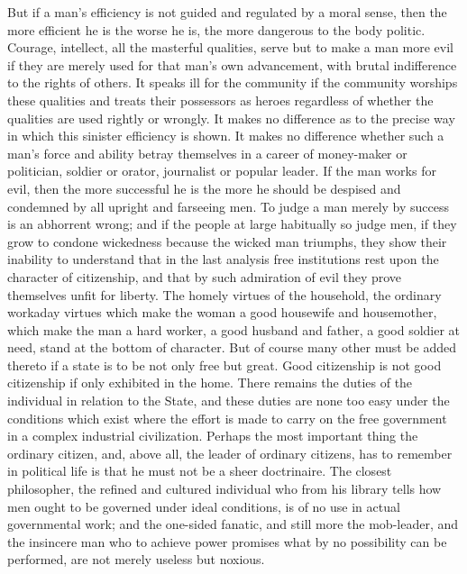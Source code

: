 \documentclass{scrbook}
\begin{document}
But if a man’s efficiency is not guided and regulated by a moral sense, then the more
efficient he is the worse he is, the more dangerous to the body politic. Courage, intellect, all
the masterful qualities, serve but to make a man more evil if they are merely used for that
man’s own advancement, with brutal indifference to the rights of others. It speaks ill for the
community if the community worships these qualities and treats their possessors as heroes
regardless of whether the qualities are used rightly or wrongly. It makes no difference as to
the precise way in which this sinister efficiency is shown. It makes no difference whether
such a man’s force and ability betray themselves in a career of money-maker or politician,
soldier or orator, journalist or popular leader. If the man works for evil, then the more
successful he is the more he should be despised and condemned by all upright and farseeing men. To judge a man merely by success is an abhorrent wrong; and if the people at
large habitually so judge men, if they grow to condone wickedness because the wicked man
triumphs, they show their inability to understand that in the last analysis free institutions rest
upon the character of citizenship, and that by such admiration of evil they prove themselves
unfit for liberty. The homely virtues of the household, the ordinary workaday virtues which
make the woman a good housewife and housemother, which make the man a hard worker,
a good husband and father, a good soldier at need, stand at the bottom of character. But
of course many other must be added thereto if a state is to be not only free but great.
Good citizenship is not good citizenship if only exhibited in the home. There remains the
duties of the individual in relation to the State, and these duties are none too easy under
the conditions which exist where the effort is made to carry on the free government in a
complex industrial civilization. Perhaps the most important thing the ordinary citizen, and,
above all, the leader of ordinary citizens, has to remember in political life is that he must
not be a sheer doctrinaire. The closest philosopher, the refined and cultured individual who
from his library tells how men ought to be governed under ideal conditions, is of no use in
actual governmental work; and the one-sided fanatic, and still more the mob-leader, and the
insincere man who to achieve power promises what by no possibility can be performed, are
not merely useless but noxious.
\end{document}

